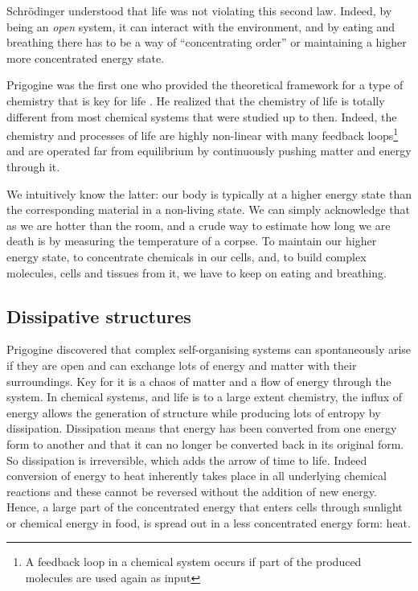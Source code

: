 \documentclass[
  11pt,
]{book}
\begin{document}
Schrödinger understood that life was not violating this second law. Indeed, by being an \emph{open} system, it can interact with the environment, and by eating and breathing there has to be a way of ``concentrating order'' or maintaining a higher more concentrated energy state.

Prigogine was the first one who provided the theoretical framework for a type of chemistry that is key for life \citep{prigogineStengers1984}. He realized that the chemistry of life is totally different from most chemical systems that were studied up to then. Indeed, the chemistry and processes of life are highly non-linear with many feedback loops\footnote{A feedback loop in a chemical system occurs if part of the produced molecules are used again as input} and are operated far from equilibrium by continuously pushing matter and energy through it.

We intuitively know the latter: our body is typically at a higher energy state than the corresponding material in a non-living state. We can simply acknowledge that as we are hotter than the room, and a crude way to estimate how long we are death is by measuring the temperature of a corpse. To maintain our higher energy state, to concentrate chemicals in our cells, and, to build complex molecules, cells and tissues from it, we have to keep on eating and breathing.

\hypertarget{dissipative-structures}{%
\subsection{Dissipative structures}\label{dissipative-structures}}

Prigogine discovered that complex self-organising systems can spontaneously arise if they are open and can exchange lots of energy and matter with their surroundings.
Key for it is a chaos of matter and a flow of energy through the system.
In chemical systems, and life is to a large extent chemistry, the influx of energy allows the generation of structure while producing lots of entropy by dissipation. Dissipation means that energy has been converted from one energy form to another and that it can no longer be converted back in its original form. So dissipation is irreversible, which adds the arrow of time to life. Indeed conversion of energy to heat inherently takes place in all underlying chemical reactions and these cannot be reversed without the addition of new energy. Hence, a large part of the concentrated energy that enters cells through sunlight or chemical energy in food, is spread out in a less concentrated energy form: heat.
\end{document}
